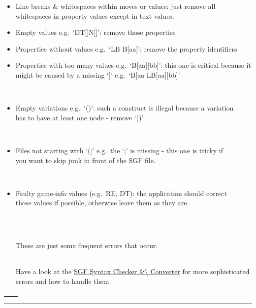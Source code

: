 \begin{itemize}
\item
  Line breaks \& whitespaces within moves or values: just remove all
  whitespaces in property values except in text values.
\item
  Empty values e.g.~`DT{[}{]}N{[}{]}': remove those properties
\item
  Properties without values e.g.~`LB B{[}aa{]}': remove the property
  identifiers
\item
  Properties with too many values e.g.~`B{[}aa{]}{[}bb{]}': this one is
  critical because it might be caused by a missing `{]}' e.g.~`B{[}aa
  LB{[}aa{]}{[}bb{]}'\\
  \strut \\
\item
  Empty variations e.g.~`()': such a construct is illegal because a
  variation\\
  has to have at least one node - remove `()'\\
  \strut \\
\item
  Files not starting with `(;' e.g.~the `;' is missing - this one is
  tricky if\\
  you want to skip junk in front of the SGF file.\\
  \strut \\
\item
  Faulty game-info values (e.g.~RE, DT): the application should
  correct\\
  those values if possible, otherwise leave them as they are.\\
  \strut \\
  \strut \\
  These are just some frequent errors that occur.\\
  \strut \\
  Have a look at the \href{https://red-bean.com/sgf/sgfc/index.html}{SGF
  Syntax Checker \&\textbackslash{} Converter} for more sophisticated
  errors and how to handle them.
\end{itemize}

\newpage

{\def\LTcaptype{none} %
\begin{longtable}[]{@{}ll@{}}
\toprule\noalign{}
\endhead
\bottomrule\noalign{}
\endlastfoot
\end{longtable}
}

\begin{center}\rule{0.5\linewidth}{0.5pt}\end{center}

